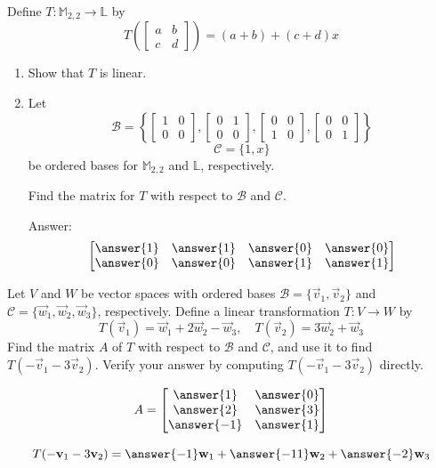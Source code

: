 \documentclass{ximera}
\begin{document}
\begin{problem}\label{prob:m22tolpart1}
Define $T:\mathbb{M}_{2,2}\rightarrow \mathbb{L}$ by 
$$T\left(\begin{bmatrix}a&b\\c&d\end{bmatrix}\right)=(a+b)+(c+d)x$$
\begin{enumerate}
\item Show that $T$ is linear.
\item
Let
$$\mathcal{B}=\left\{\begin{bmatrix}1&0\\0&0\end{bmatrix}, \begin{bmatrix}0&1\\0&0\end{bmatrix}, \begin{bmatrix}0&0\\1&0\end{bmatrix}, \begin{bmatrix}0&0\\0&1\end{bmatrix}\right\}$$
$$\mathcal{C}=\{1, x\}$$
be ordered bases for $\mathbb{M}_{2,2}$ and $\mathbb{L}$, respectively.

Find the matrix for $T$ with respect to $\mathcal{B}$ and $\mathcal{C}$.

Answer:
$$\begin{bmatrix}\answer{1}&\answer{1}&\answer{0}&\answer{0}\\\answer{0}&\answer{0}&\answer{1}&\answer{1}\end{bmatrix}$$
\end{enumerate}
\end{problem}


\begin{problem}\label{prob:matlintransabstract1}
Let $V$ and $W$ be vector spaces with ordered bases $\mathcal{B}=\{\vec{v}_1, \vec{v}_2\}$ and $\mathcal{C}=\{\vec{w}_1, \vec{w}_2, \vec{w}_3\}$, respectively.  Define a linear transformation $T:V\rightarrow W$ by $$T(\vec{v}_1)=\vec{w}_1+2\vec{w}_2-\vec{w}_3,\quad T(\vec{v}_2)=3\vec{w}_2+\vec{w}_3$$
Find the matrix $A$ of $T$ with respect to $\mathcal{B}$ and $\mathcal{C}$, and use it to find $T(-\vec{v}_1-3\vec{v}_2)$.  Verify your answer by computing $T(-\vec{v}_1-3\vec{v}_2)$ directly.

$$A=\begin{bmatrix}\answer{1}&\answer{0}\\\answer{2}&\answer{3}\\\answer{-1}&\answer{1}\end{bmatrix}$$

$$T(-\vec{v}_1-3\vec{v}_2)=\answer{-1}\vec{w}_1+\answer{-11}\vec{w}_2+\answer{-2}\vec{w}_3$$
\end{problem}
\end{document}
